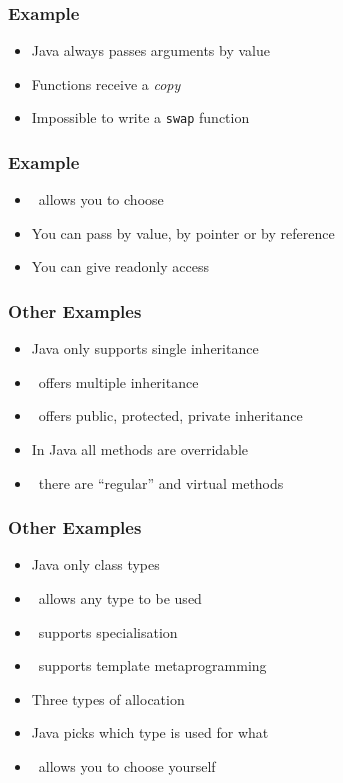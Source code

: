 \begin{frame}
  \frametitle{Example}
  \begin{itemize}
    \item Java always passes arguments by value
    \item Functions receive a \emph{copy}
    \item Impossible to write a \texttt{swap} function
  \end{itemize}
\end{frame}

\begin{frame}
  \frametitle{Example}
  \begin{itemize}
    \item \cpp\ allows you to choose
    \item You can pass by value, by pointer or by reference
    \item You can give readonly access
  \end{itemize}
\end{frame}

\begin{frame}
  \frametitle{Other Examples}
  \begin{itemize}
    \item Java only supports single inheritance
    \item \cpp\ offers multiple inheritance
    \item \cpp\ offers public, protected, private inheritance
  \end{itemize}
  \vskip5mm
  \begin{itemize}
    \item In Java all methods are overridable
    \item \cpp\ there are ``regular'' and virtual methods
  \end{itemize}
\end{frame}

\begin{frame}
  \frametitle{Other Examples}
  \begin{itemize}
    \item Java only class types
    \item \cpp\ allows any type to be used
    \item \cpp\ supports specialisation
    \item \cpp\ supports template metaprogramming
  \end{itemize}
  \vskip5mm
  \begin{itemize}
    \item Three types of allocation
    \item Java picks which type is used for what
    \item \cpp\ allows you to choose yourself
  \end{itemize}
\end{frame}

